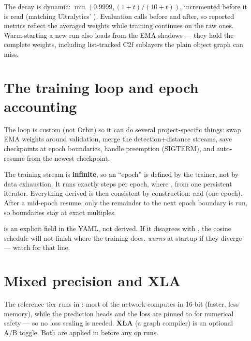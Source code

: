 \begin{hood}
The decay is dynamic: $\min(0.9999, (1+t)/(10+t))$, incremented before it is read (matching
Ultralytics' ). Evaluation calls  before and 
after, so reported metrics reflect the averaged weights while training continues on the raw
ones. Warm-starting a new run also loads from the EMA shadows --- they hold the complete
weights, including list-tracked C2f sublayers the plain object graph can miss.
\end{hood}

\section{The training loop and epoch accounting}
The loop is custom (not Orbit) so it can do several project-specific things: swap EMA
weights around validation, merge the detection+distance streams, save checkpoints at epoch
boundaries, handle preemption (SIGTERM), and auto-resume from the newest checkpoint.

\begin{hood}
The training stream is \textbf{infinite}, so an ``epoch'' is defined by the trainer, not by
data exhaustion. It runs exactly  steps per epoch, where
, from one persistent
iterator. Everything derived is then consistent by construction:
 and
 (one epoch). After a mid-epoch resume, only
the remainder to the next epoch boundary is run, so boundaries stay at exact multiples.
\end{hood}

\begin{pitfall}
 is an explicit field in the YAML, not derived. If it disagrees with
, the cosine schedule will not finish where the
training does.  \emph{warns} at startup if they diverge --- watch for
that line.
\end{pitfall}

\section{Mixed precision and XLA}
The reference tier runs in \textbf{}: most of the network computes in
16-bit  (faster, less memory), while the prediction heads and the loss are
pinned to  for numerical safety --- so no loss scaling is needed. \textbf{XLA}
(a graph compiler) is an optional A/B toggle. Both are applied in
 before any op runs.

